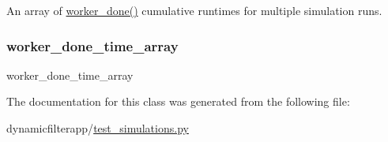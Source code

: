 An array of \mbox{\hyperlink{namespacedynamicfilterapp_1_1views__helpers_af27860dfe5bfa6b2b8a1b29347eb918d}{worker\+\_\+done()}} cumulative runtimes for multiple simulation runs. 

\mbox{\label{classdynamicfilterapp_1_1test__simulations_1_1_simulation_test_a680da985b1b53b139f765033ec8a59ae}} 
\subsubsection{\texorpdfstring{worker\_done\_time\_array}{worker\_done\_time\_array}\hspace{0.1cm}{\footnotesize\ttfamily [2/2]}}
{\footnotesize\ttfamily worker\+\_\+done\+\_\+time\+\_\+array}



The documentation for this class was generated from the following file\+:\begin{DoxyCompactItemize}
\item 
dynamicfilterapp/\mbox{\hyperlink{test__simulations_8py}{test\+\_\+simulations.\+py}}\end{DoxyCompactItemize}
